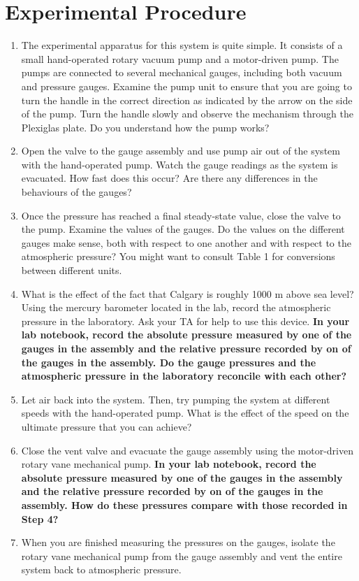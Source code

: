 \section{Experimental Procedure}
\begin{enumerate}
\item The experimental apparatus for this system is quite simple. It consists of a small hand-operated rotary vacuum pump and a motor-driven pump. The pumps are connected to several mechanical gauges, including both vacuum and pressure gauges. Examine the pump unit to ensure that you are going to turn the handle in the correct direction as indicated by the arrow on the side of the pump. Turn the handle slowly and observe the mechanism through the Plexiglas plate. Do you understand how the pump works?

\item Open the valve to the gauge assembly and use pump air out of the system with the hand-operated pump. Watch the gauge readings as the system is evacuated. How fast does this occur? Are there any differences in the behaviours of the gauges? 

\item Once the pressure has reached a final steady-state value, close the valve to the pump. Examine the values of the gauges. Do the values on the different gauges make sense, both with respect to one another and with respect to the atmospheric pressure? You might want to consult Table 1 for conversions between different units.

\item What is the effect of the fact that Calgary is roughly 1000 m above sea level? Using the mercury barometer located in the lab, record the atmospheric pressure in the laboratory. Ask your TA for help to use this device. {\bf In your lab notebook, record the absolute pressure measured by one of the gauges in the assembly and the relative pressure recorded by on of the gauges in the assembly. Do the gauge pressures and the atmospheric pressure in the laboratory reconcile with each other?}

\item Let air back into the system. Then, try pumping the system at different speeds with the hand-operated pump. What is the effect of the speed on the ultimate pressure that you can achieve?

\item Close the vent valve and evacuate the gauge assembly using the motor-driven rotary vane mechanical pump. {\bf In your lab notebook, record the absolute pressure measured by one of the gauges in the assembly and the relative pressure recorded by on of the gauges in the assembly. How do these pressures compare with those recorded in Step 4?}

\item When you are finished measuring the pressures on the gauges, isolate the rotary vane mechanical pump from the gauge assembly and vent the entire system back to atmospheric pressure.
\end{enumerate}

